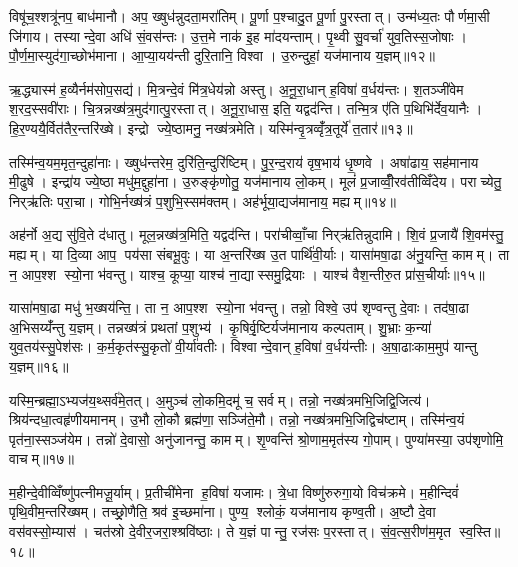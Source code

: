 विषू॑च॒श्शत्रू॑नप॒ बाध॑मानौ। अप॒ ख्षुध॑न्नुदता॒मरा॑तिम्। पू॒र्णा प॒श्चादु॒त पू॒र्णा पु॒रस्तात्। उन्म॑ध्य॒तः पौर्णमा॒सी जि॑गाय। तस्यान्दे॒वा अधि॑ सं॒वस॑न्तः। उ॒त्त॒मे नाक॑ इ॒ह मा॑दयन्ताम्। पृ॒थ्वी सु॒वर्चा॑ युव॒तिस्स॒जोषाः। पौ॒र्ण॒मा॒स्युद॑गा॒च्छोभ॑माना। आ॒प्या॒यय॑न्ती दुरि॒तानि॒ विश्वा। उ॒रुन्दुहां॒ यज॑मानाय य॒ज्ञम्॥१२॥\anuvakamend[चि॒त्रभा॑नु॒र्यज॑माने दधातु ह॒विर्न॒ पाथ॒श्चेतो॑ जुषन्ता॒ञ्चेतो॑ मदेम॒ रोच॑माना॒मरा॑तीर्गो॒पौ य॒ज्ञम्]

ऋ॒द्ध्यास्म॑ ह॒व्यैर्नम॑सोप॒सद्य॑। मि॒त्रन्दे॒वं मि॑त्र॒धेय॑न्नो अस्तु। अ॒नू॒रा॒धान् ह॒विषा॑ व॒र्धय॑न्तः। श॒तञ्जी॑वेम श॒रद॒स्सवी॑राः। चि॒त्रन्नख्ष॑त्र॒मुद॑गात्पु॒रस्तात्। अ॒नू॒रा॒धास॒ इति॒ यद्वद॑न्ति। तन्मि॒त्र ए॑ति प॒थिभि॑र्देव॒यानैः। हि॒र॒ण्ययै॒र्वित॑तैर॒न्तरि॑ख्षे। इन्द्रो ज्ये॒ष्ठामनु॒ नख्ष॑त्रमेति। यस्मि॑न्वृ॒त्रव्वृँ॑त्र॒तूर्ये॑ त॒तार॑॥१३॥

तस्मि॑न्व॒यम॒मृत॒न्दुहा॑नाः। ख्षुध॑न्तरेम॒ दुरि॑ति॒न्दुरि॑ष्टिम्। पु॒र॒न्द॒राय॑ वृष॒भाय॑ धृ॒ष्णवे। अषा॑ढाय॒ सह॑मानाय मी॒ढुषे। इन्द्रा॑य ज्ये॒ष्ठा मधु॑म॒द्दुहा॑ना। उ॒रुङ्कृ॑णोतु॒ यज॑मानाय लो॒कम्। मूलं॑ प्र॒जाव्वीँ॒रव॑तीव्विँदेय। पराच्येतु॒ निर्‌ऋ॑तिः परा॒चा। गोभि॒र्नख्ष॑त्रं प॒शुभि॒स्सम॑क्तम्। अह॑र्भूया॒द्यज॑मानाय॒ मह्यम्॥१४॥

अह॑र्नो अ॒द्य सु॑वि॒ते द॑धातु। मूल॒न्नख्ष॑त्र॒मिति॒ यद्वद॑न्ति। परा॑चीव्वाँ॒चा निर्‌ऋ॑तिन्नुदामि। शि॒वं प्र॒जायै॑ शि॒वम॑स्तु॒ मह्यम्। या दि॒व्या आप॒ पय॑सा संबभू॒वुः। या अ॒न्तरि॑ख्ष उ॒त पार्थि॑वी॒र्याः। यासा॑मषा॒ढा अ॑नु॒यन्ति॒ कामम्। ता न॒ आप॒श्श स्यो॒ना भ॑वन्तु। याश्च॒ कूप्या॒ याश्च॑ ना॒द्यास्समु॒द्रियाः। याश्च॑ वैश॒न्तीरु॒त प्रा॑स॒चीर्याः॥१५॥

यासा॑मषा॒ढा मधु॑ भ॒ख्षय॑न्ति॒। ता न॒ आप॒श्श स्यो॒ना भ॑वन्तु। तन्नो॒ विश्वे॒ उप॑ शृण्वन्तु दे॒वाः। तद॑षा॒ढा अ॒भिसय्यँ॑न्तु य॒ज्ञम्। तन्नख्ष॑त्रं प्रथतां प॒शुभ्य॑। कृ॒षिर्वृ॒ष्टिर्यज॑मानाय कल्पताम्। शु॒भ्राः क॒न्या॑ युव॒तय॑स्सु॒पेश॑सः। क॒र्म॒कृत॑स्सु॒कृतो॑ वी॒र्या॑वतीः। विश्वान्दे॒वान् ह॒विषा॑ व॒र्धय॑न्तीः। अ॒षा॒ढाःकाम॒मुप॑ यान्तु य॒ज्ञम्॥१६॥

यस्मि॒न्ब्रह्मा॒ऽभ्यज॑य॒थ्सर्व॑मे॒तत्। अ॒मुञ्च॑ लो॒कमि॒दमू॑ च॒ सर्वम्। तन्नो॒ नख्ष॑त्रमभि॒जिद्वि॒जित्य॑। श्रिय॑न्दधा॒त्वहृ॑णीयमानम्। उ॒भौ लो॒कौ ब्रह्म॑णा॒ सञ्जि॑ते॒मौ। तन्नो॒ नख्ष॑त्रमभि॒जिद्विच॑ष्टाम्। तस्मि॑न्व॒यं पृत॑ना॒स्सञ्ज॑येम। तन्नो॑ दे॒वासो॒ अनु॑जानन्तु॒ कामम्। शृ॒ण्वन्ति॑ श्रो॒णाम॒मृत॑स्य गो॒पाम्। पुण्या॑मस्या॒ उप॑शृणोमि॒ वाचम्॥१७॥

म॒हीन्दे॒वीव्विँष्णु॑पत्नीमजू॒र्याम्। प्र॒तीची॑मेना ह॒विषा॑ यजामः। त्रे॒धा विष्णु॑रुरुगा॒यो विच॑क्रमे। म॒हीन्दिवं॑ पृथि॒वीम॒न्तरि॑ख्षम्। तच्छ्रो॒णैति॒ श्रव॑ इ॒च्छमा॑ना। पुण्य॒ श्लोकं॒ यज॑मानाय कृण्व॒ती। अ॒ष्टौ दे॒वा वस॑वस्सो॒म्यास॑। चत॑स्रो दे॒वीर॒जरा॒श्श्रवि॑ष्ठाः। ते य॒ज्ञं पान्तु॒ रज॑सः प॒रस्तात्। सं॒व॒त्स॒रीण॑म॒मृत स्व॒स्ति॥१८॥

